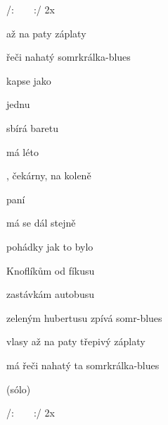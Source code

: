 

/:  ~  ~   :/ 2x

\zs
{} až na paty  záplaty 

 řeči nahatý somrkrálka-blues 

 kapse jako  

 jednu  

 sbírá  baretu 

 má léto  

\ks

\zr
{}, čekárny,  na koleně 

 paní  

 má se  dál stejně 

 pohádky  jak to bylo 

  

   
\kr

\zs
Knoflíkům od fíkusu

zastávkám autobusu 

zeleným hubertusu zpívá somr-blues 

vlasy až na paty třepivý záplaty 

má řeči nahatý ta somrkrálka-blues 
\ks

\zr \kr

\zs
(sólo)
\ks

\zr \kr

/:  ~  ~   :/ 2x

\kp